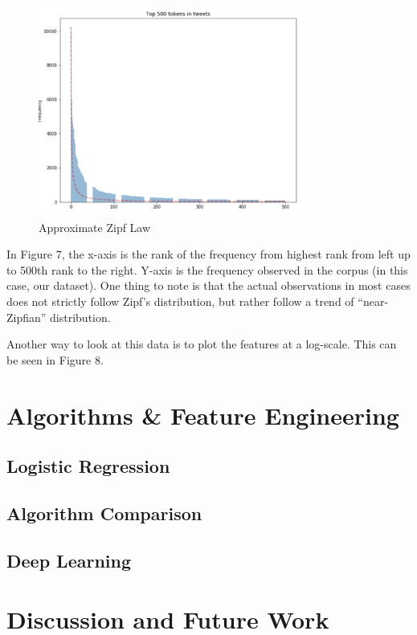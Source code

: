 \documentclass{article}
\begin{document}
	\begin{figure}[h]
		\label{Figure 6}
		\caption{Approximate Zipf Law}
		\includegraphics[width=9cm]{zipf.png}
		\centering
	\end{figure}
	
	
	In Figure 7, the x-axis is the rank of the frequency from highest rank from left up to 500th rank to the right. Y-axis is the frequency observed in the corpus (in this case, our dataset). One thing to note is that the actual observations in most cases does not strictly follow Zipf’s distribution, but rather follow a trend of “near-Zipfian” distribution.
	
	Another way to look at this data is to plot the features at a log-scale. This can be seen in Figure 8.
	
	
	
	

	
	\section{Algorithms \& Feature Engineering}
	\subsection{Logistic Regression}
	\subsection{Algorithm Comparison}
	\subsection{Deep Learning}
	\section{Discussion and Future Work}
\end{document}
